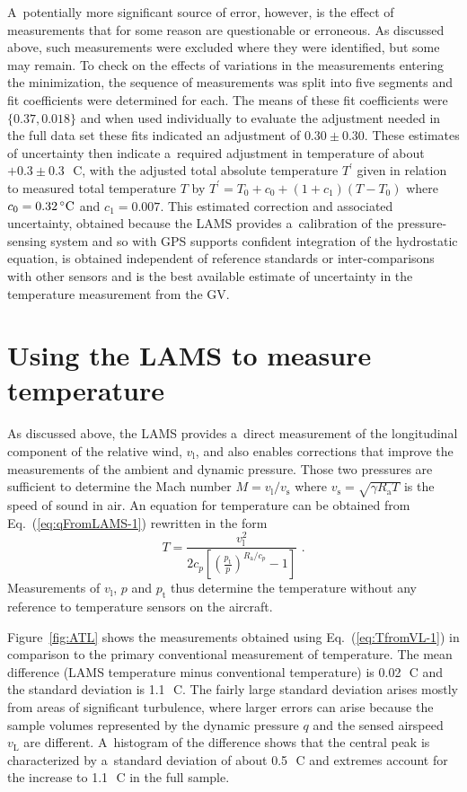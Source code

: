 \documentclass[amtd, online, hvmath]{copernicus}
\begin{document}
A~potentially more significant source of error, however, is the effect
of measurements that for some reason are questionable or erroneous.
As discussed above, such measurements were excluded where they were
identified, but some may remain. To check on the effects of variations
in the measurements entering the minimization, the sequence of
measurements was split into five segments and fit coefficients were
determined for each. The means of these fit coefficients were $\{0.37,
0.018\}$ and when used individually to evaluate the adjustment needed
in the full data set these fits indicated an adjustment of $0.30 \pm
0.30.$ These estimates of uncertainty then indicate a~required
adjustment in temperature of about $+0.3\pm 0.3$\,\unit{{\degree}C},
with the adjusted total absolute temperature $T^{\prime}$ given in
relation to measured total temperature $T$ by
$T^{\prime}=T_0+c_0+\left(1+c_1\right)\left(T-T_0\right)$ where
$c_0=0.32\,\unit{{\degree}C}$ and $c_1=0.007$. This estimated
correction and associated uncertainty, obtained because the LAMS
provides a~calibration of the pressure-sensing system and so with GPS
supports confident integration of the hydrostatic equation, is
obtained independent of reference standards or inter-comparisons with
other sensors and is the best available estimate of uncertainty in the
temperature measurement from the GV.

\section{Using the LAMS to measure temperature}

As discussed above, the LAMS provides a~direct measurement of the
longitudinal component of the relative wind, $v_{\mathrm{l}}$, and
also enables corrections that improve the measurements of the ambient
and dynamic pressure. Those two pressures are sufficient to determine
the Mach number $M=v_{\mathrm{l}}/v_{\mathrm{s}}$ where
$v_{\mathrm{s}}=\sqrt{\gamma R_{\mathrm{a}}T}$ is the speed of sound
in air. An equation for temperature can be obtained
from Eq.~(\ref{eq:qFromLAMS-1}) rewritten in the form
\begin{equation}
T=\frac{v_{\mathrm{l}}^2}{2c_p\left[\left(\frac{p_{\mathrm{t}}}{p}\right)^{R_{\mathrm{a}}/c_p}-1\right]}\,\,.\label{eq:TfromVL-1}
\end{equation}
Measurements of $v_{\mathrm{l}}$, $p$ and $p_{\mathrm{t}}$ thus
determine the temperature without any reference to temperature sensors
on the aircraft.

Figure~\ref{fig:ATL} shows the measurements obtained using
Eq.~(\ref{eq:TfromVL-1}) in comparison to the primary conventional
measurement of temperature.  The mean difference (LAMS temperature
minus conventional temperature) is 0.02\,\unit{{\degree}C} and the
standard deviation is 1.1\,\unit{{\degree}C}.  The fairly large
standard deviation arises mostly from areas of significant turbulence,
where larger errors can arise because the sample volumes represented
by the dynamic pressure $q$ and the sensed airspeed $v_{\mathrm{L}}$ are
different. A~histogram of the difference shows that the central peak
is characterized by a~standard deviation of about
0.5\,\unit{{\degree}C} and extremes account for the increase to
1.1\,\unit{{\degree}C} in the full sample.
\end{document}
